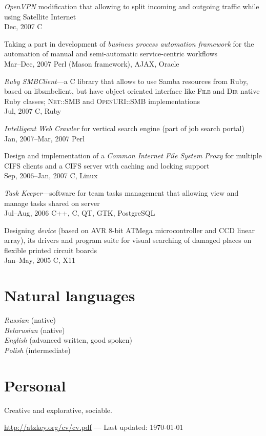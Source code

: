 \documentclass[12pt, a4paper]{article}
\newcommand{\years}[2]{\marginpar{\scriptsize #1 #2}}
\begin{document}
\begin{list}{}{\leftmargin=0pt}
		\item \textit{OpenVPN} modification that allowing to split incoming and outgoing traffic while using Satellite
		Internet\\
		Dec, 2007 \hfill C

		\item Taking a part in development of \textit{business process automation framework}
		for the automation of manual and semi-automatic service-centric
		workflows\\
		Mar--Dec, 2007 \hfill Perl (Mason framework), AJAX, Oracle

		\item \textit{Ruby SMBClient}---a C library that allows to use Samba resources from Ruby, based on
		libsmbclient, but have object oriented interface like \textsc{File} and \textsc{Dir} native Ruby classes;
		\textsc{Net::SMB} and \textsc{OpenURI::SMB} implementations\\
		Jul, 2007 \hfill C, Ruby

		\item \textit{Intelligent Web Crawler} for vertical search engine (part of job search
		portal)\\
		Jan, 2007--Mar, 2007 \hfill Perl

		\item Design and implementation of a \textit{Common Internet File System Proxy}
		for multiple CIFS clients and a CIFS server with caching and locking
		support\\
		Sep, 2006--Jan, 2007 \hfill C, Linux

		\item \textit{Task Keeper}---software for team tasks management that allowing view and
		manage tasks shared on server\\
		Jul--Aug, 2006 \hfill C++, C, QT, GTK, PostgreSQL

		\item Designing \textit{device} \years{2005}{University project} (based on AVR 8-bit ATMega microcontroller and CCD
		linear array), its drivers and program suite for visual searching of damaged
		places on flexible printed circuit boards\\
		Jan--May, 2005 \hfill C, X11
	\end{list}

	\section*{Natural languages}
	\textit{Russian} (native)\\
	\textit{Belarusian} (native)\\
	\textit{English} (advanced written, good spoken)\\
	\textit{Polish} (intermediate)

	\section*{Personal}
	Creative and explorative, sociable.

	\vfill{}
	\hrulefill
	\begin{center}
		\footnotesize \href{http://atzkey.org/cv/cv.pdf}{http://atzkey.org/cv/cv.pdf} — Last updated: \today
	\end{center}
\end{document}
